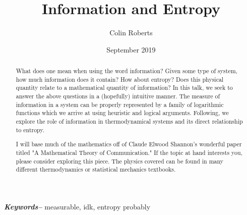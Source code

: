 \documentclass[12pt]{article}
\title{Information and Entropy}
\author{Colin Roberts}
\date{September 2019}
\providecommand{\keywords}[1]
{
    \hspace*{0pt}\small	
  \textbf{\textit{Keywords--}} #1
}
\begin{document}
\begin{titlingpage}
    \maketitle
    \vfill
    \begin{abstract}
        What does one mean when using the word information? Given some type of system, how much information does it contain? How about entropy? Does this physical quantity relate to a mathematical quantity of information? In this talk, we seek to answer the above questions in a (hopefully) intuitive manner. The measure of information in a system can be properly represented by a family of logarithmic functions which we arrive at using heuristic and logical arguments. Following, we explore the role of information in thermodynamical systems and its direct relationship to entropy.
        
        I will base much of the mathematics off of Claude Elwood Shannon's wonderful paper titled "A Mathematical Theory of Communication." If the topic at hand interests you, please consider exploring this piece. The physics covered can be found in many different thermodynamics or statistical mechanics textbooks.
        
        
    \end{abstract}
    \keywords{measurable, idk, entropy probably}
\end{titlingpage}


\end{document}

